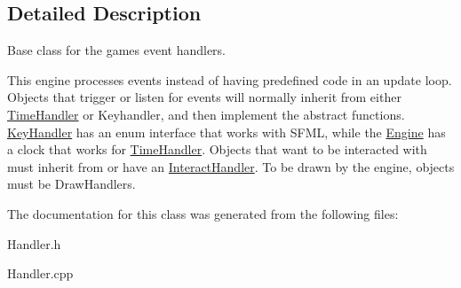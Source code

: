 \subsection{Detailed Description}
Base class for the game\textquotesingle{}s event handlers. 

This engine processes events instead of having predefined code in an update loop. Objects that trigger or listen for events will normally inherit from either \hyperlink{class_time_handler}{Time\+Handler} or Keyhandler, and then implement the abstract functions. \hyperlink{class_key_handler}{Key\+Handler} has an enum interface that works with S\+F\+ML, while the \hyperlink{class_engine}{Engine} has a clock that works for \hyperlink{class_time_handler}{Time\+Handler}. Objects that want to be interacted with must inherit from or have an \hyperlink{class_interact_handler}{Interact\+Handler}. To be drawn by the engine, objects must be Draw\+Handlers. 

The documentation for this class was generated from the following files\+:\begin{DoxyCompactItemize}
\item 
Handler.\+h\item 
Handler.\+cpp\end{DoxyCompactItemize}
